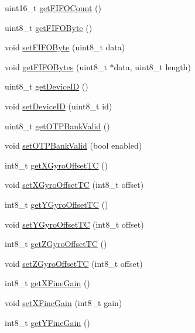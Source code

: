 \begin{DoxyCompactItemize}
\item 
uint16\+\_\+t \mbox{\hyperlink{classMPU6050_ad96c7a75a39327ebaae01386bcbc58dd}{get\+F\+I\+F\+O\+Count}} ()
\item 
uint8\+\_\+t \mbox{\hyperlink{classMPU6050_a7733011d30d5b64564f6b5422d8639ae}{get\+F\+I\+F\+O\+Byte}} ()
\item 
void \mbox{\hyperlink{classMPU6050_a66da5bc38aa82404117d1ef5306c951a}{set\+F\+I\+F\+O\+Byte}} (uint8\+\_\+t data)
\item 
void \mbox{\hyperlink{classMPU6050_aba36dcb767b5cd8965053987aaa08a6a}{get\+F\+I\+F\+O\+Bytes}} (uint8\+\_\+t $\ast$data, uint8\+\_\+t length)
\item 
uint8\+\_\+t \mbox{\hyperlink{classMPU6050_a35ae3c8894b3258e642043886801e031}{get\+Device\+ID}} ()
\item 
void \mbox{\hyperlink{classMPU6050_aaefb4b3d93cf4b78d56cd63b10ea0e97}{set\+Device\+ID}} (uint8\+\_\+t id)
\item 
uint8\+\_\+t \mbox{\hyperlink{classMPU6050_a6eb099e3dc96eb4d113cf81804256e8c}{get\+O\+T\+P\+Bank\+Valid}} ()
\item 
void \mbox{\hyperlink{classMPU6050_a074024a7818b2998b3f1c99064bea3a0}{set\+O\+T\+P\+Bank\+Valid}} (bool enabled)
\item 
int8\+\_\+t \mbox{\hyperlink{classMPU6050_afb6b0de954cc89e161e5ac389102af0c}{get\+X\+Gyro\+Offset\+TC}} ()
\item 
void \mbox{\hyperlink{classMPU6050_a571bb0b54080a1def63fb4166b7f7f59}{set\+X\+Gyro\+Offset\+TC}} (int8\+\_\+t offset)
\item 
int8\+\_\+t \mbox{\hyperlink{classMPU6050_aeec244d6f9d33f45260ff459fabb9622}{get\+Y\+Gyro\+Offset\+TC}} ()
\item 
void \mbox{\hyperlink{classMPU6050_a5a671929be9a7d6ff5e433aa0eaa0c90}{set\+Y\+Gyro\+Offset\+TC}} (int8\+\_\+t offset)
\item 
int8\+\_\+t \mbox{\hyperlink{classMPU6050_afb9254a04feb7909cb808e94fa4fc44c}{get\+Z\+Gyro\+Offset\+TC}} ()
\item 
void \mbox{\hyperlink{classMPU6050_a1d9fc7f1058c4ab9a8a586e3fc30d12d}{set\+Z\+Gyro\+Offset\+TC}} (int8\+\_\+t offset)
\item 
int8\+\_\+t \mbox{\hyperlink{classMPU6050_a9c9332a5050be54fa47f321be01d524b}{get\+X\+Fine\+Gain}} ()
\item 
void \mbox{\hyperlink{classMPU6050_a73d4473d134cf5f7c516ff38faa2b4a8}{set\+X\+Fine\+Gain}} (int8\+\_\+t gain)
\item 
int8\+\_\+t \mbox{\hyperlink{classMPU6050_ad471fd5499dd2fbf730c066a8893420d}{get\+Y\+Fine\+Gain}} ()

\end{DoxyCompactItemize}
